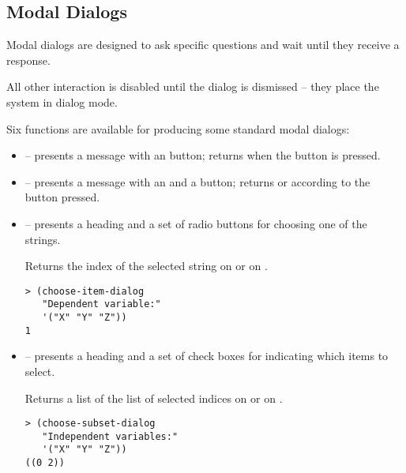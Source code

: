 \begin{slide}{}
\subsection{Modal Dialogs}
Modal dialogs are designed to ask specific questions and wait until
they receive a response.

All other interaction is disabled until the dialog is dismissed -- they
place the system in dialog mode.

Six functions are available for producing some standard modal dialogs:

\begin{itemize}
\item
{} -- presents a message with an
 button; returns  when the button is pressed.
\item
{} -- presents a message with an
 and a  button; returns  or 
according to the button pressed.
\end{itemize}
\end{slide}

\begin{slide}{}
\begin{itemize}
\item
{} --
presents a heading and a set of radio buttons for choosing one of the
strings.

Returns the index of the selected string on  or
 on .
{\Large
\begin{verbatim}
> (choose-item-dialog
   "Dependent variable:"
   '("X" "Y" "Z"))
1
\end{verbatim}}
\item
{} --
presents a heading and a set of check boxes for indicating which items
to select.

Returns a list of the list of selected indices on  or
 on .
{\Large
\begin{verbatim}
> (choose-subset-dialog
   "Independent variables:"
   '("X" "Y" "Z"))
((0 2))
\end{verbatim}}
\end{itemize}
\end{slide}

